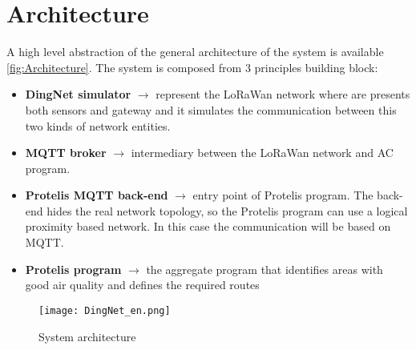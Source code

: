 \chapter{Architecture}

A high level abstraction of the general architecture of the system is available \autoref{fig:Architecture}.
The system is composed from 3 principles building block:
\begin{itemize}
    \item \textbf{DingNet simulator} $\rightarrow$ represent the LoRaWan network where are presents both sensors and gateway and it simulates the communication between this two kinds of network entities.
    \item \textbf{MQTT broker} $\rightarrow$ intermediary between the LoRaWan network and AC program.
    \item \textbf{Protelis MQTT back-end} $\rightarrow$ entry point of Protelis program. The back-end hides the real network topology, so the Protelis program can use a logical proximity based network. In this case the communication will be based on MQTT.
    \item \textbf{Protelis program} $\rightarrow$ the aggregate program that identifies areas with good air quality and defines the required routes
\end{itemize}

\begin{figure}[h]
    \centering
    \texttt{[image: DingNet\_en.png]}
    \caption{System architecture}
    \label{fig:Architecture}
\end{figure}